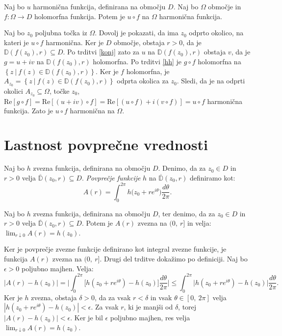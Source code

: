 \documentclass[mat1]{fmfdelo}
\begin{document}
    \begin{trditev}
        \label{komp_s_hol}
        Naj bo $u$ harmonična funkcija, definirana na območju $D$. Naj bo $\Omega$ območje in $f : \Omega \to D$ holomorfna funkcija. Potem je $u \circ f$ na $\Omega$ harmonična funkcija.
    \end{trditev}
    \begin{dokaz}
        Naj bo $z_0$ poljubna točka iz $\Omega$. Dovolj je pokazati, da ima $z_0$ odprto okolico, na kateri je $u \circ f$ harmonična. Ker je $D$ območje, obstaja $r > 0$, da je \mbox{$\mathbb{D}(f(z_0), r) \subseteq D$}. 
        Po trditvi \ref{konj} zato za $u$ na $\mathbb{D}(f(z_0),r)$ obstaja $v$, da je $g = u + iv$ na $\mathbb{D}(f(z_0), r)$ holomorfna. Po trditvi \ref{hh} je $g \circ f$ holomorfna na $\left\{z~|~ f(z) \in \mathbb{D}(f(z_0), r)\right\}$.
        Ker je $f$ holomorfna, je $A_{z_0} = \left\{z~|~ f(z) \in \mathbb{D}(f(z_0), r)\right\}$ odprta okolica za $z_0$. Sledi, da je na odprti okolici $A_{z_0} \subseteq \Omega$, točke $z_0$, $\text{Re}[g \circ f] = \text{Re}[(u + iv)\circ f] = \text{Re}[(u \circ f) + i(v \circ f)] = u \circ f$ harmonična funkcija. 
        Zato je $u \circ f$ harmonična na $\Omega$.
    \end{dokaz}

\section{Lastnost povprečne vrednosti}

    \begin{definicija}  
        Naj bo $h$ zvezna funkcija, definirana na območju $D$. Denimo, da za $z_0 \in D$ in $r > 0$ velja $\overline{\mathbb{D}}(z_0, r) \subseteq D$. \emph{Povprečje funkcije} $h$ na $\overline{\mathbb{D}}(z_0, r)$ definiramo kot:
        $$
            A(r) = \int_{0}^{2 \pi}{h \big(z_0 + r e^{i\theta}\big)\frac{d\theta}{2 \pi}}.
        $$
    \end{definicija}
    \begin{trditev}
        \label{zvpov}
        Naj bo $h$ zvezna funkcija, definirana na območju $D$, ter denimo, da za $z_0 \in D$ in $r > 0$ velja $\overline{\mathbb{D}}(z_0, r) \subseteq D$. 
        Potem je $A(r)$ zvezna na $(0,~r]$ in velja: $\lim_{r \downarrow 0}{A(r)} = h(z_0)$.
    \end{trditev}
    \begin{dokaz}
        Ker je povprečje zvezne funkcije definirano kot integral zvezne funkcije, je funkcija $A(r)$ zvezna na $(0,~r]$. Drugi del trditve dokažimo po definiciji.
        Naj bo $\epsilon > 0$ poljubno majhen. Velja:
        $$
            |A(r) - h(z_0)| = \bigg|\int_{0}^{2\pi} \big[h(z_0 + r e^{i\theta})  - h(z_0)\big] \frac{d\theta}{2\pi} \bigg| \leq \int_{0}^{2 \pi} \big| h(z_0 + r e^{i\theta}) - h(z_0) \big| \frac{d\theta}{2 \pi}.
        $$
        Ker je $h$ zvezna, obstaja $\delta > 0$, da za vsak $r < \delta$ in vsak $\theta \in [0,~2\pi]$ velja \mbox{$|h(z_0 + r e^{i\theta}) - h(z_0)| < \epsilon$}.
        Za vsak $r$, ki je manjši od $\delta$, torej $|A(r) - h(z_0)| < \epsilon$. Ker je bil $\epsilon$ poljubno majhen, res velja $\lim_{r \downarrow 0}{A(r)} = h(z_0)$.
    \end{dokaz}
\end{document}
